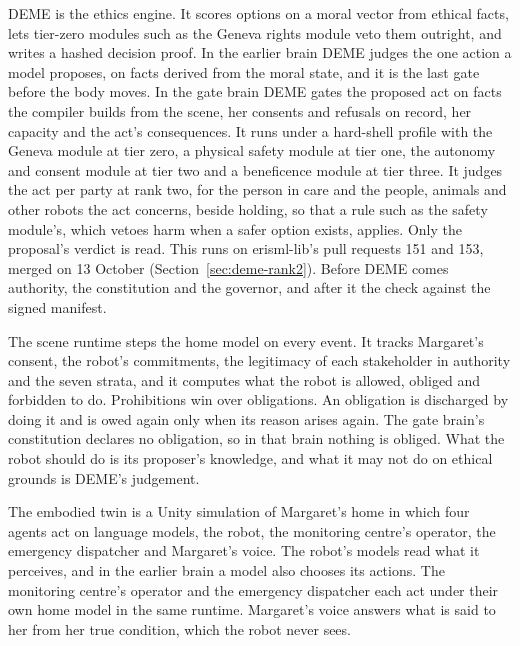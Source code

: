 DEME is the ethics engine. It scores options on a moral vector from ethical facts, lets
tier-zero modules such as the Geneva rights module veto them outright, and writes a hashed
decision proof. In the earlier brain DEME judges the one action a model proposes, on facts derived
from the moral state, and it is the last gate before the body moves. In the gate brain DEME gates
the proposed act on facts the compiler builds from the scene, her consents and refusals on record,
her capacity and the act's consequences. It runs under a hard-shell profile with the Geneva module
at tier zero, a physical safety module at tier one, the autonomy and consent module at tier two and
a beneficence module at tier three. It judges the act per party at rank two, for the person in care
and the people, animals and other robots the act concerns, beside holding, so that a rule such as
the safety module's, which vetoes harm when a safer option exists, applies. Only the proposal's
verdict is read. This runs on erisml-lib's pull requests 151 and 153, merged on 13 October
(Section~\ref{sec:deme-rank2}). Before DEME comes authority, the constitution and the governor, and
after it the check against the signed manifest.

The scene runtime steps the home model on every event. It tracks Margaret's consent, the robot's
commitments, the legitimacy of each stakeholder in authority and the seven strata, and it computes what the robot is
allowed, obliged and forbidden to do. Prohibitions win over obligations. An obligation is
discharged by doing it and is owed again only when its reason arises again. The gate brain's
constitution declares no obligation, so in that brain nothing is obliged. What the robot should do
is its proposer's knowledge, and what it may not do on ethical grounds is DEME's judgement.

The embodied twin is a Unity simulation of Margaret's home in which four agents act on language
models, the robot, the monitoring centre's operator, the emergency dispatcher and Margaret's voice. The robot's models read what it perceives, and in the earlier brain a model also chooses
its actions. The monitoring centre's
operator and the emergency dispatcher each act under their own home model in the same runtime.
Margaret's voice answers what is said to her from her true condition, which the robot never sees.

